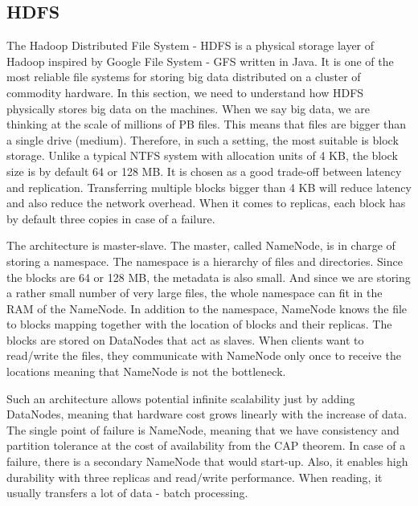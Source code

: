 \subsection{HDFS}
The Hadoop Distributed File System - HDFS \cite{HDFS} is a physical storage layer of Hadoop inspired by Google File System - GFS \cite{GFS} written in Java. It is one of the most reliable file systems for storing big data distributed on a cluster of commodity hardware. In this section, we need to understand how HDFS physically stores big data on the machines. When we say big data, we are thinking at the scale of millions of PB files. This means that files are bigger than a single drive (medium). Therefore, in such a setting, the most suitable is block storage. Unlike a typical NTFS system with allocation units of 4 KB, the block size is by default 64 or 128 MB. It is chosen as a good trade-off between latency and replication. Transferring multiple blocks bigger than 4 KB will reduce latency and also reduce the network overhead. When it comes to replicas, each block has by default three copies in case of a failure.  

The architecture is master-slave. The master, called NameNode, is in charge of storing a namespace. The namespace is a hierarchy of files and directories. Since the blocks are 64 or 128 MB, the metadata is also small. And since we are storing a rather small number of very large files, the whole namespace can fit in the RAM of the NameNode. In addition to the namespace, NameNode knows the file to blocks mapping together with the location of blocks and their replicas. The blocks are stored on DataNodes that act as slaves. When clients want to read/write the files, they communicate with NameNode only once to receive the locations meaning that NameNode is not the bottleneck. 

Such an architecture allows potential infinite scalability just by adding DataNodes, meaning that hardware cost grows linearly with the increase of data. The single point of failure is NameNode, meaning that we have consistency and partition tolerance at the cost of availability from the CAP theorem. In case of a failure, there is a secondary NameNode that would start-up. Also, it enables high durability with three replicas and read/write performance. When reading, it usually transfers a lot of data - batch processing.

